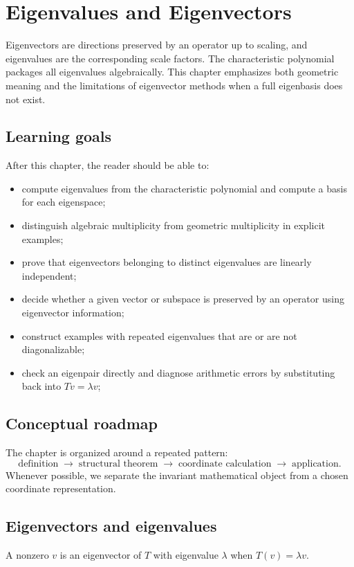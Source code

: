 \chapter{Eigenvalues and Eigenvectors}
\label{ch:i09-eigenvalues-and-eigenvectors}

Eigenvectors are directions preserved by an operator up to scaling, and eigenvalues are the corresponding scale factors. The characteristic polynomial packages all eigenvalues algebraically. This chapter emphasizes both geometric meaning and the limitations of eigenvector methods when a full eigenbasis does not exist.

\section*{Learning goals}
After this chapter, the reader should be able to:
\begin{itemize}
\item compute eigenvalues from the characteristic polynomial and compute a basis for each eigenspace;
\item distinguish algebraic multiplicity from geometric multiplicity in explicit examples;
\item prove that eigenvectors belonging to distinct eigenvalues are linearly independent;
\item decide whether a given vector or subspace is preserved by an operator using eigenvector information;
\item construct examples with repeated eigenvalues that are or are not diagonalizable;
\item check an eigenpair directly and diagnose arithmetic errors by substituting back into \(Tv=\lambda v\);
\end{itemize}
\section*{Conceptual roadmap}
The chapter is organized around a repeated pattern:
\[
\boxed{\text{definition}\;\longrightarrow\;\text{structural theorem}\;\longrightarrow\;\text{coordinate calculation}\;\longrightarrow\;\text{application}.}
\]
Whenever possible, we separate the invariant mathematical object from a chosen coordinate representation.

\section{Eigenvectors and eigenvalues}
A nonzero $v$ is an eigenvector of $T$ with eigenvalue $\lambda$ when $T(v)=\lambda v$.


